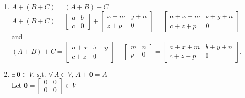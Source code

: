 \documentclass{report}
\begin{document}
{\begin{enumerate}
                \( A + B = \begin{bmatrix}
                    a + x & b + y \\
                    c + z & 0
                \end{bmatrix} = \begin{bmatrix}
                    x + a & y + b \\
                    z + c & 0
                \end{bmatrix} = B + A. \)
        \item \( A + (B + C) = (A + B) + C \) \\
                \( A + (B + C) = \begin{bmatrix}
                    a & b \\
                    c & 0
                \end{bmatrix} + \begin{bmatrix}
                    x + m & y + n \\
                    z + p & 0
                \end{bmatrix} = \begin{bmatrix}
                    a + x + m & b + y + n \\
                    c + z + p & 0
                \end{bmatrix} \) \\
                and \( (A + B) + C = \begin{bmatrix}
                    a + x & b + y \\
                    c + z & 0
                \end{bmatrix} + \begin{bmatrix}
                    m & n \\
                    p & 0
                \end{bmatrix} = \begin{bmatrix}
                    a + x + m & b + y + n \\
                    c + z + p & 0
                \end{bmatrix}. \) 
        \item \( \exists\, \boldsymbol{0} \in V,\, \text{s.t. } \forall\, A \in V,\, A + \boldsymbol{0} = A \) \\
                Let \( \boldsymbol{0} = \begin{bmatrix}
                    0 & 0 \\
                    0 & 0
                \end{bmatrix} \in V \) \\

\end{enumerate}}
\end{document}
